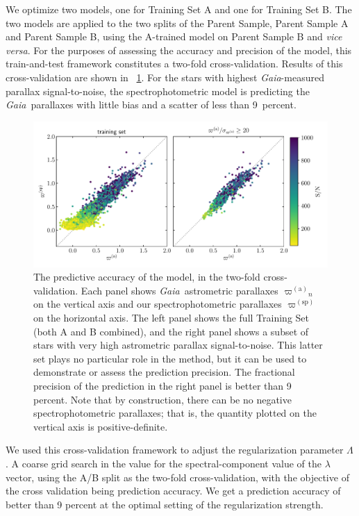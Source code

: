 \documentclass[modern]{aastex62}
\newcommand{\foreign}[1]{\textsl{#1}}
\newcommand{\project}[1]{\textsl{#1}}
\newcommand{\gaia}{\project{Gaia}}
\newcommand{\gparallax}{{\varpi^{(\mathrm{a})}}}
\newcommand{\sparallax}{{\varpi^{(\mathrm{sp})}}}
\begin{document}
We optimize two models, one for Training Set A and one for Training Set B.
The two models are applied to the two splits of the Parent Sample, Parent Sample
A and Parent Sample B, using the A-trained model on Parent Sample B and
\foreign{vice versa}.
For the purposes of assessing the accuracy and precision of the model, this
train-and-test framework constitutes a two-fold cross-validation.
Results of this cross-validation are shown in \figurename~\ref{fig:xval}.
For the stars with highest \gaia-measured parallax signal-to-noise,
the spectrophotometric model is predicting the \gaia\ parallaxes with little bias
and a scatter of less than 9~percent.
\begin{figure}
\includegraphics[width=\textwidth]{residuals.pdf}
\caption{The predictive accuracy of the model, in the two-fold cross-validation.
  Each panel shows \gaia\ astrometric parallaxes $\gparallax_n$ on the vertical axis
  and our spectrophotometric parallaxes $\sparallax$ on the horizontal axis.
  The left panel shows the full Training Set (both A and B combined),
  and the right panel shows a
  subset of stars with very high astrometric parallax signal-to-noise. This latter
  set plays no particular role in the method, but it can be used to demonstrate or
  assess the prediction precision. The fractional precision of the prediction in the
  right panel is better than 9 percent. Note that by construction, there can be no negative
  spectrophotometric parallaxes; that is, the quantity plotted on the vertical axis is
  positive-definite.\label{fig:xval}}
\end{figure}

We used this cross-validation framework to adjust the regularization parameter $\Lambda$.
A coarse grid search in the value for the spectral-component value of the
$\lambda$ vector, using the A/B split as the two-fold cross-validation, with the objective
of the cross validation being prediction accuracy.
We get a prediction accuracy of better than 9 percent 
at the optimal setting of the regularization strength.
\end{document}
